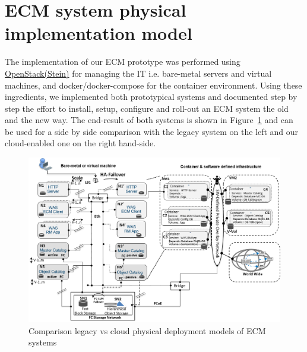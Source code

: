 \documentclass[EPiC]{easychair} %
\begin{document}
\section{ECM system physical implementation model}
    The implementation of our ECM prototype was performed using \href{https://www.openstack.org/software/stein/}{OpenStack(Stein)} for managing the IT i.e. bare-metal servers and virtual machines, and docker/docker-compose for the container environment. Using these ingredients, we implemented both prototypical systems and documented step by step the effort to install, setup, configure and roll-out an ECM system the old and the new way. The end-result of both systems is shown in Figure~\ref{fig:ecm-model-implementaion} and can be used for a side by side comparison with the legacy system on the left and our cloud-enabled one on the right hand-side. \\

   
\begin{figure}[hbt!]
	\begin{centering}
	\includegraphics[width=1.0\textwidth]{pics/ECMPic17c.png}
	\caption{Comparison legacy vs cloud physical deployment models of ECM systems}
	\label{fig:ecm-model-implementaion}
	\end{centering}
\end{figure}
\end{document}
